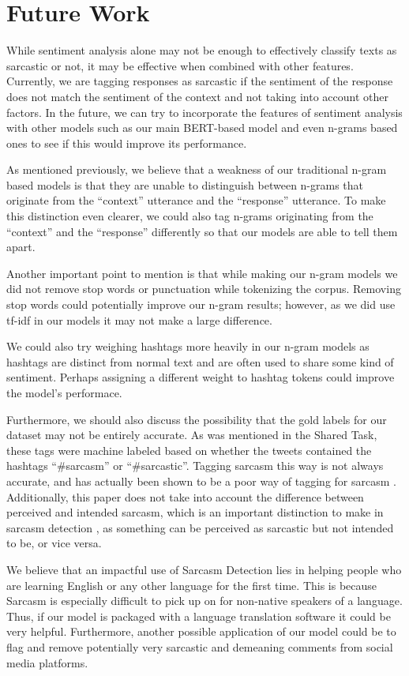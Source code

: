 \documentclass[11pt,a4paper]{article}
\begin{document}
\section{Future Work}

While sentiment analysis alone may not be enough to effectively classify texts as sarcastic or not, it may be effective when combined with other features. Currently,
we are tagging responses as sarcastic if the sentiment of the response does not match the sentiment of the context and not taking into account other factors. In the future, we can
try to incorporate the features of sentiment analysis with other models such as our main BERT-based model and even n-grams based ones to see if this would improve its performance.

As mentioned previously, we believe that a weakness of our traditional n-gram based models is that they are unable to distinguish between n-grams that originate from the
``context'' utterance and the ``response'' utterance.  To make this distinction even clearer, we could also tag n-grams originating from the ``context'' and the ``response'' differently so that our models are able to tell them apart. 

Another important point to mention is that while making our n-gram models we did not remove stop words or punctuation while tokenizing the corpus. Removing stop words could
potentially improve our n-gram results; however, as we did use tf-idf in our models it may not make a large difference. 

We could also try weighing hashtags more heavily in our n-gram models as hashtags are distinct from normal text and are often used to share some kind of sentiment. Perhaps
assigning a different weight to hashtag tokens could improve the model's performace.

Furthermore, we should also discuss the possibility that the gold labels for our dataset may not be entirely accurate. As was mentioned in the Shared Task, these tags were machine
labeled based on whether the tweets contained the hashtags ``\#sarcasm'' or ``\#sarcastic''. Tagging sarcasm this way is not always accurate, and has actually been shown to be a
poor way of tagging for sarcasm \cite{opreaiSarcasm}. Additionally, this paper does not take into account the difference between perceived and intended sarcasm, which is an important
distinction to make in sarcasm detection \cite{oprea}, as something can be perceived as sarcastic but not intended to be, or vice versa.

We believe that an impactful use of Sarcasm Detection lies in helping people who are learning English or any other language for the first time. This is because Sarcasm is
especially difficult to pick up on for non-native speakers of a language. Thus, if our model is packaged with a language translation software it could be very helpful. Furthermore,
another possible application of our model could be to flag and remove potentially very sarcastic and demeaning comments from social media platforms.


\end{document}
